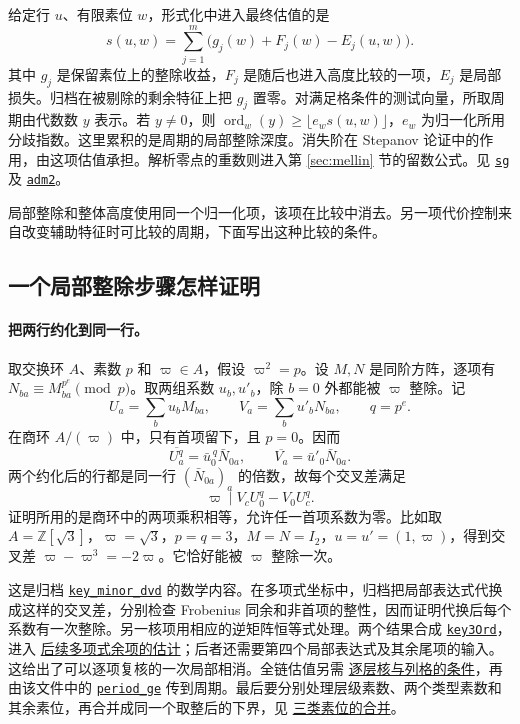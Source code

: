 \documentclass[UTF8,fontset=none,a4paper,11pt]{ctexart}
\theoremstyle{definition}
\newcommand{\src}[3]{\href{https://github.com/leanprover-community/riemann-hypothesis/blob/23aebbb302010b292314d406aa97f7901d698634/src/#1.lean\#L#2}{#3}}
\begin{document}
给定行 $u$、有限素位 $w$，形式化中进入最终估值的是
\[
 s(u,w)=\sum_{j=1}^m \bigl(g_j(w)+F_j(w)-E_j(u,w)\bigr).
\]
其中 $g_j$ 是保留素位上的整除收益，$F_j$ 是随后也进入高度比较的一项，$E_j$ 是局部损失。归档在被剔除的剩余特征上把 $g_j$ 置零。对满足格条件的测试向量，所取周期由代数数 $y$ 表示。若 $y\ne0$，则
$\operatorname{ord}_w(y)\ge\lfloor e_ws(u,w)\rfloor$，$e_w$ 为归一化所用分歧指数。这里累积的是周期的局部整除深度。消失阶在 Stepanov 论证中的作用，由这项估值承担。解析零点的重数则进入第 \ref{sec:mellin} 节的留数公式。见 \src{Formalism/LocalRingCardinality/DataParams₂}{208}{\texttt{sg}}
及 \src{Formalism/SharpRestriction/Divisibility/LocalQuadraticParts}{206}{\texttt{adm2}}。

局部整除和整体高度使用同一个归一化项，该项在比较中消去。另一项代价控制来自改变辅助特征时可比较的周期，下面写出这种比较的条件。

\subsection{一个局部整除步骤怎样证明}\label{sec:local-step}

\paragraph{把两行约化到同一行。}
取交换环 $A$、素数 $p$ 和 $\varpi\in A$，假设 $\varpi^2=p$。设 $M,N$ 是同阶方阵，逐项有 $N_{ba}\equiv M_{ba}^{p^e}\pmod p$。取两组系数 $u_b,u'_b$，除 $b=0$ 外都能被 $\varpi$ 整除。记
\[
 U_a=\sum_b u_bM_{ba},\qquad V_a=\sum_b u'_bN_{ba},\qquad q=p^e .
\]
在商环 $A/(\varpi)$ 中，只有首项留下，且 $p=0$。因而
\[
 \overline{U_a^q}=\bar u_0^{\,q}\bar N_{0a},\qquad
 \overline{V_a}=\bar u'_0\bar N_{0a}.
\]
两个约化后的行都是同一行 $(\bar N_{0a})_a$ 的倍数，故每个交叉差满足
\[
             \varpi\mid V_cU_0^q-V_0U_c^q .
\]
证明所用的是商环中的两项乘积相等，允许任一首项系数为零。比如取 $A=\mathbb Z[\sqrt3]$，$\varpi=\sqrt3$，$p=q=3$，$M=N=I_2$，$u=u'=(1,\varpi)$，得到交叉差 $\varpi-\varpi^3=-2\varpi$。它恰好能被 $\varpi$ 整除一次。

这是归档 \src{Formalism/SharpRestriction/GrowthBounds/CoarseMultiplicity/KeyMinorDvd}{132}{\texttt{key\_minor\_dvd}} 的数学内容。在多项式坐标中，归档把局部表达式代换成这样的交叉差，分别检查 Frobenius 同余和非首项的整性，因而证明代换后每个系数有一次整除。另一核项用相应的逆矩阵恒等式处理。两个结果合成
\src{Formalism/SharpRestriction/GrowthBounds/CoarseMultiplicity/KeyMinorDvd}{222}{\texttt{key3Ord}}，
进入 \src{Formalism/SharpRestriction/GrowthBounds/CoarseMultiplicity}{30}{后续多项式余项的估计}；后者还需要第四个局部表达式及其余尾项的输入。这给出了可以逐项复核的一次局部相消。全链估值另需 \src{Formalism/SharpRestriction/GrowthBounds/WeilJacquetShalikaLaw}{97}{逐层核与列格的条件}，再由该文件中的 \src{Formalism/SharpRestriction/GrowthBounds/WeilJacquetShalikaLaw}{419}{\texttt{period\_ge}} 传到周期。最后要分别处理层级素数、两个类型素数和其余素位，再合并成同一个取整后的下界，见 \src{Formalism/SharpRestriction/Divisibility/WeightDegreeSizes}{1075}{三类素位的合并}。
\end{document}

